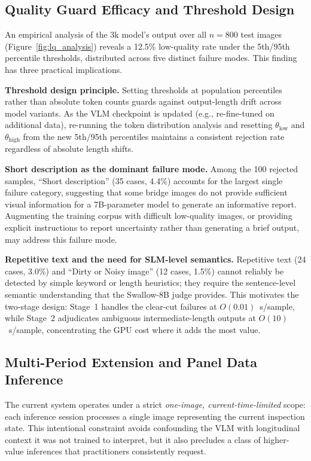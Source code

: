 \documentclass[twocolumn]{article}
\begin{document}
\subsection{Quality Guard Efficacy and Threshold Design}
\label{sec:disc_qg}

An empirical analysis of the 3k model's output over all $n=800$ test images
(Figure~\ref{fig:lq_analysis}) reveals a 12.5\% low-quality rate under the
5th/95th percentile thresholds, distributed across five distinct failure
modes.  This finding has three practical implications.

\textbf{Threshold design principle.}
Setting thresholds at population percentiles rather than absolute token counts
guards against output-length drift across model variants.
As the VLM checkpoint is updated (e.g., re-fine-tuned on additional data),
re-running the token distribution analysis and resetting $\theta_{\text{low}}$
and $\theta_{\text{high}}$ from the new 5th/95th percentiles maintains a
consistent rejection rate regardless of absolute length shifts.

\textbf{Short description as the dominant failure mode.}
Among the 100 rejected samples, ``Short description'' (35 cases, 4.4\%)
accounts for the largest single failure category,
suggesting that some bridge images do not provide sufficient visual
information for a 7B-parameter model to generate an informative report.
Augmenting the training corpus with difficult low-quality images, or
providing explicit instructions to report uncertainty rather than generating
a brief output, may address this failure mode.

\textbf{Repetitive text and the need for SLM-level semantics.}
Repetitive text (24 cases, 3.0\%) and ``Dirty or Noisy image'' (12 cases,
1.5\%) cannot reliably be detected by simple keyword or length heuristics;
they require the sentence-level semantic understanding that the Swallow-8B
judge provides.  This motivates the two-stage design: Stage~1 handles the
clear-cut failures at $O(0.01)$~s/sample, while Stage~2 adjudicates
ambiguous intermediate-length outputs at $O(10)$~s/sample, concentrating
the GPU cost where it adds the most value.

\subsection{Multi-Period Extension and Panel Data Inference}
\label{sec:disc_panel}

The current system operates under a strict \textit{one-image,
current-time-limited} scope: each inference session processes a single
image representing the current inspection state.
This intentional constraint avoids confounding the VLM with longitudinal
context it was not trained to interpret, but it also precludes a class of
higher-value inferences that practitioners consistently request.
\end{document}

